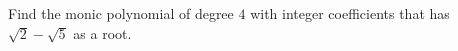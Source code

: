 Find the monic polynomial of degree $4$ with integer coefficients that has $\sqrt2-\sqrt5$ as a root.
